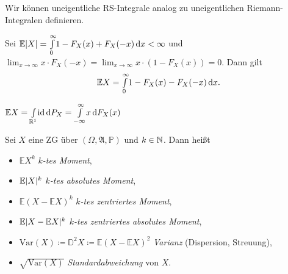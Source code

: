 \documentclass{cheat-sheet}
\newcommand{\Alg}{\mathfrak{A}} %
\renewcommand{\P}{\mathbb{P}} %
\newcommand{\E}{\mathbb{E}} %
\newcommand{\Var}{\mathrm{Var}} %
\begin{document}
\begin{bem}
  Wir können uneigentliche RS-Integrale analog zu uneigentlichen Riemann-Integralen definieren.
\end{bem}

\begin{satz}
  Sei $\E \abs{X} = \Int{0}{\infty}{1 - F_X(x) + F_X(-x)}{x} < \infty$ und $\lim_{x \to \infty} x \cdot F_X(-x) = \lim_{x \to \infty} x \cdot (1-F_X(x)) = 0$. Dann gilt
  \[ \E X = \Int{0}{\infty}{1 - F_X(x) - F_X(-x)}{x}. \]
\end{satz}

\iffalse
  \[ \E X = \Int{- \infty}{\infty}{x}{F(x)} \]

  Falls $\lim{x \to \infty} x F_X(-x) = \lim{x \to \infty} x (1 - F_X(x)) = 0$, so gilt

  Genauso werden Erwartungswerte von Funktionen von $X$ berechnet, z.B. mit $x^2 F_X(-x) \xrightarrow{x \to \infty} 0$ und $x^2 (1 - F_X(x)) \xrightarrow{x \to \infty} 0$

  $\E X^2 = 2 \Int{0}{\infty}{x (1 - F_X(x) + F_X(-x))}{x} = \P(|X| > x)$ (falls $F_X$ stetig)

  $\E |X|^k = k \Int{0}{\infty}{x^{k-1} (1 - F_X(x) + F_X(-x))}{x}$
\fi

\begin{satz}
  $\E X = \Int{\R^1}{}{\id}{P_X} = \Int{-\infty}{\infty}{x}{F_X(x)}$
\end{satz}



\begin{defn}
  Sei $X$ eine ZG über $(\Omega, \Alg, \P)$ und $k \in \mathbb{N}$. Dann heißt
  \begin{itemize}
    \item $\E X^k$ \emph{$k$-tes Moment},
    \item $\E \abs{X}^k$ \emph{$k$-tes absolutes Moment},
    \item $\E (X - \E X)^k$ \emph{$k$-tes zentriertes Moment},
    \item $\E \abs{X - \E X}^k$ \emph{$k$-tes zentriertes absolutes Moment},
    \item $\Var(X) \coloneqq \mathbb{D}^2 X \coloneqq \E (X - \E X)^2$ \emph{Varianz} (Dispersion, Streuung),
    \item $\sqrt{\Var(X)}$ \emph{Standardabweichung} von $X$.
  \end{itemize}
\end{defn}
\end{document}

